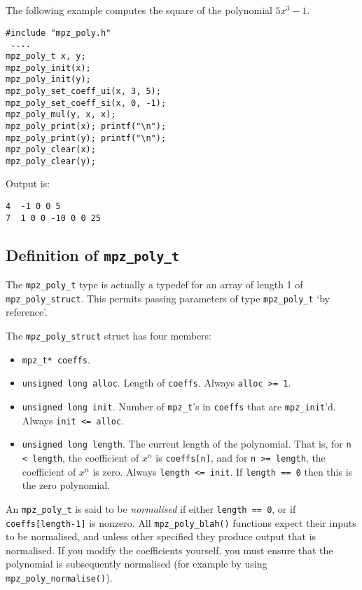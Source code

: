 \documentclass[a4paper,10pt]{article}
\newcommand{\code}{\lstinline}
\begin{document}
The following example computes the square of the polynomial $5x^3 - 1$.

\begin{lstlisting}
#include "mpz_poly.h"
 ....
mpz_poly_t x, y;
mpz_poly_init(x);
mpz_poly_init(y);
mpz_poly_set_coeff_ui(x, 3, 5);
mpz_poly_set_coeff_si(x, 0, -1);
mpz_poly_mul(y, x, x);
mpz_poly_print(x); printf("\n");
mpz_poly_print(y); printf("\n");
mpz_poly_clear(x);
mpz_poly_clear(y);
\end{lstlisting}

Output is:

\begin{lstlisting}
4  -1 0 0 5
7  1 0 0 -10 0 0 25
\end{lstlisting}

\subsection{Definition of \code{mpz_poly_t}}

The \code{mpz_poly_t} type is actually a typedef for an array of length 1 of \code{mpz_poly_struct}. This permits passing parameters  of type \code{mpz_poly_t} `by reference'.

The \code{mpz_poly_struct} struct has four members:
\begin{itemize}
\item \code{mpz_t* coeffs}.
\item \code{unsigned long alloc}. Length of \code{coeffs}. Always \code{alloc >= 1}.
\item \code{unsigned long init}. Number of \code{mpz_t}'s in \code{coeffs} that are \code{mpz_init}'d. Always \code{init <= alloc}.
\item \code{unsigned long length}. The current length of the polynomial. That is, for \code{n < length}, the coefficient of $x^n$ is \code{coeffs[n]}, and for \code{n >= length}, the coefficient of $x^n$ is zero. Always \code{length <= init}. If \code{length == 0} then this is the zero polynomial. 
\end{itemize}

An \code{mpz_poly_t} is said to be \emph{normalised} if either \code{length == 0}, or if \code{coeffs[length-1]} is nonzero. All \code{mpz_poly_blah()} functions expect their inputs to be normalised, and unless other specified they produce output that is normalised. If you modify the coefficients yourself, you must ensure that the polynomial is subsequently normalised (for example by using \code{mpz_poly_normalise()}).
\end{document}
